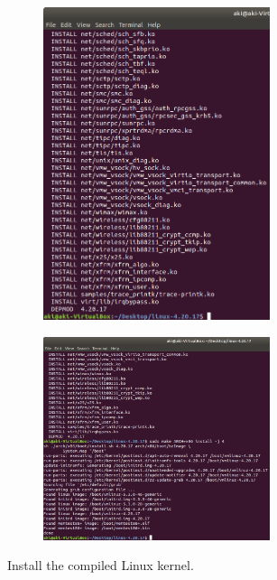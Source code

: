 \documentclass[11pt,letterpaper,titlepage]{article}
\begin{document}
\begin{figure}[ht]
    \centering
    \begin{subfigure}[b]{0.39\textwidth}
    \includegraphics[width=0.73\textwidth]{3.install 1.png}
    \end{subfigure}
    \begin{subfigure}[b]{0.60\textwidth}
    \includegraphics[width=0.73\textwidth]{4.install 2.png}
    \end{subfigure}
    \caption{Install the compiled Linux kernel.}
\end{figure}
\end{document}
